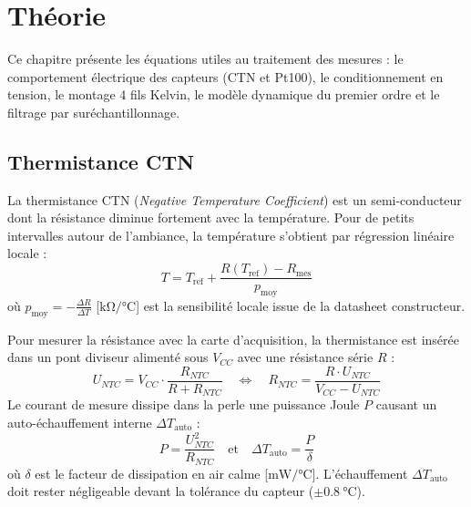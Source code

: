 \chapter{Théorie}
\label{chap:theorie}

\setlength{\abovedisplayskip}{5pt}
\setlength{\belowdisplayskip}{5pt}
\setlength{\abovedisplayshortskip}{2pt}
\setlength{\belowdisplayshortskip}{2pt}

Ce chapitre présente les équations utiles au traitement des mesures : le comportement électrique des capteurs (CTN et Pt100), le conditionnement en tension, le montage 4 fils Kelvin, le modèle dynamique du premier ordre et le filtrage par suréchantillonnage.

\section{Thermistance CTN}
\label{sec:theorie_ntc}

La thermistance CTN (\textit{Negative Temperature Coefficient}) est un semi-conducteur dont la résistance diminue fortement avec la température. Pour de petits intervalles autour de l'ambiance, la température s'obtient par régression linéaire locale :
\begin{equation}
    T = T_{\text{ref}} + \frac{R(T_{\text{ref}}) - R_{\text{mes}}}{p_{\text{moy}}}
    \label{eq:theorie_pente_locale}
\end{equation}
où $p_{\text{moy}} = -\frac{\Delta R}{\Delta T}$ [$\unit{\kilo\ohm\per\degreeCelsius}$] est la sensibilité locale issue de la datasheet constructeur.

Pour mesurer la résistance avec la carte d'acquisition, la thermistance est insérée dans un pont diviseur alimenté sous $V_{CC}$ avec une résistance série $R$ :
\begin{equation}
    U_{NTC} = V_{CC} \cdot \frac{R_{NTC}}{R + R_{NTC}} \quad \iff \quad R_{NTC} = \frac{R \cdot U_{NTC}}{V_{CC} - U_{NTC}}
    \label{eq:theorie_pont}
\end{equation}
Le courant de mesure dissipe dans la perle une puissance Joule $P$ causant un auto-échauffement interne $\Delta T_{\text{auto}}$ :
\begin{equation}
    P = \frac{U_{NTC}^2}{R_{NTC}} \quad \text{et} \quad \Delta T_{\text{auto}} = \frac{P}{\delta}
    \label{eq:theorie_puissance_auto}
\end{equation}
où $\delta$ est le facteur de dissipation en air calme [$\unit{\milli\watt\per\degreeCelsius}$]. L'échauffement $\Delta T_{\text{auto}}$ doit rester négligeable devant la tolérance du capteur ($\pm \qty{0.8}{\degreeCelsius}$).

